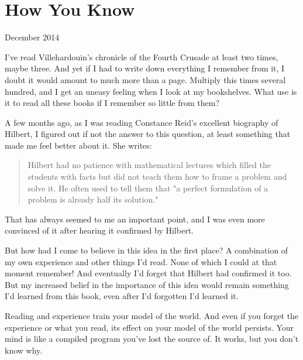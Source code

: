 \chapter{How You Know}


            
              
                

December 2014

I've read Villehardouin's chronicle
                  of the Fourth Crusade at least two times, maybe three. And yet
                  if I had to write down everything I remember from it, I doubt
                  it would amount to much more than a page. Multiply this times
                  several hundred, and I get an uneasy feeling when I look at my
                  bookshelves. What use is it to read all these books if I
                  remember so little from them?

A few months ago, as
                  I was reading Constance Reid's excellent biography of Hilbert,
                  I figured out if not the answer to this question, at least
                  something that made me feel better about it. She writes:
                  \begin{quote}

                    Hilbert had no patience with mathematical lectures which
                    filled the students with facts but did not teach them how to
                    frame a problem and solve it. He often used to tell them
                    that "a perfect formulation of a problem is already half its
                    solution."
                  
\end{quote}

                  That has always seemed to me an important point, and I was
                  even more convinced of it after hearing it confirmed by
                  Hilbert.

But how had I come to believe in this idea
                  in the first place? A combination of my own experience and
                  other things I'd read. None of which I could at that moment
                  remember! And eventually I'd forget that Hilbert had confirmed
                  it too. But my increased belief in the importance of this idea
                  would remain something I'd learned from this book, even after
                  I'd forgotten I'd learned it.

Reading and
                  experience train your model of the world. And even if you
                  forget the experience or what you read, its effect on your
                  model of the world persists. Your mind is like a compiled
                  program you've lost the source of. It works, but you don't
                  know why.

